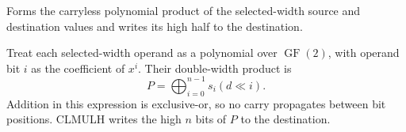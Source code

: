 Forms the carryless polynomial product of the selected-width source and destination values and writes its high half to the destination.

Treat each selected-width operand as a polynomial over \(\operatorname{GF}(2)\), with operand bit \(i\) as the coefficient of \(x^i\). Their double-width product is
\[
  P = \bigoplus_{i=0}^{n-1} s_i (d \ll i) .
\]
Addition in this expression is exclusive-or, so no carry propagates between bit positions. CLMULH writes the high \(n\) bits of \(P\) to the destination.

